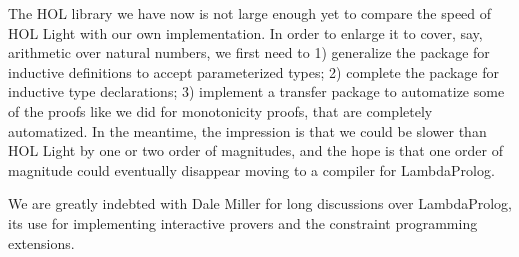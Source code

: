 \documentclass[preprint]{sigplanconf}
\begin{document}
The HOL library we have now is not large enough yet to compare the speed of HOL Light with our own implementation. In order to enlarge it to cover, say, arithmetic over natural numbers, we first need to 1) generalize the package for inductive definitions to accept parameterized types; 2) complete the package for inductive type declarations; 3) implement a transfer package to automatize some of the proofs like we did for monotonicity proofs, that are completely automatized. In the meantime, the impression is that we could be slower than HOL Light by one or two order of magnitudes, and the hope is that one order of magnitude could eventually disappear moving to a compiler for LambdaProlog.




\acks

We are greatly indebted with Dale Miller for long discussions over LambdaProlog, its use for implementing interactive provers and the constraint programming extensions.


%
\end{document}
